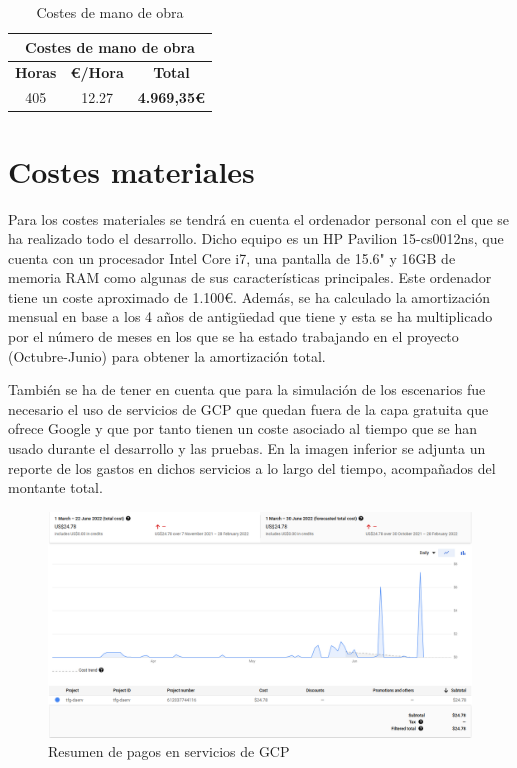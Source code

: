   \begin{table}[h]
    \begin{center}
      \begin{tabular}{ | c | c | c | }
        \hline \hline
        \multicolumn{3}{c}{Costes de mano de obra} \\ \hline \hline
        \hline \centering\textbf{Horas}\cellcolor{oranget} & \textbf{€/Hora}\cellcolor{oranget} & \textbf{Total}\cellcolor{total} \\ \hline
        405 & 12.27 & \textbf{4.969,35€}\cellcolor{total} \\ \hline
      \end{tabular}
      \caption{Costes de mano de obra}
      \label{tab:man}
    \end{center}
  \end{table}

\section*{Costes materiales}
  Para los costes materiales se tendrá en cuenta el ordenador personal con el que se ha realizado todo el desarrollo. Dicho equipo es un HP Pavilion 15-cs0012ns, que cuenta con un procesador Intel Core i7, una pantalla de 15.6" y 16GB de memoria RAM como algunas de sus características principales. Este ordenador tiene un coste aproximado de 1.100€. Además, se ha calculado la amortización mensual en base a los 4 años de antigüedad que tiene y esta se ha multiplicado por el número de meses en los que se ha estado trabajando en el proyecto (Octubre-Junio) para obtener la amortización total.

  También se ha de tener en cuenta que para la simulación de los escenarios fue necesario el uso de servicios de GCP que quedan fuera de la capa gratuita que ofrece Google y que por tanto tienen un coste asociado al tiempo que se han usado durante el desarrollo y las pruebas. En la imagen inferior se adjunta un reporte de los gastos en dichos servicios a lo largo del tiempo, acompañados del montante total. 

  \begin{figure}[h]
  \centering
  \includegraphics[width=\textwidth]{../imgs/desarrollo/facturacion/graph.png}
  \caption{Resumen de pagos en servicios de GCP}
  \end{figure}

